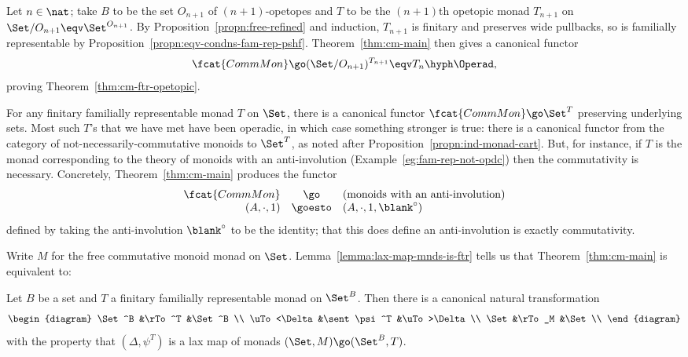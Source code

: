\begin{example}	
Let $n\in\nat$; take $B$ to be the set $O_{n+1}$ of $(n+1)$-opetopes and
$T$ to be the $(n+1)$th opetopic%
%
%
monad $T_{n+1}$ on $\Set/O_{n+1} \eqv
\Set^{O_{n+1}}$.  By Proposition~\ref{propn:free-refined} and induction,
$T_{n+1}$ is finitary and preserves wide pullbacks, so is familially
representable by Proposition~\ref{propn:eqv-condns-fam-rep-pshf}.
Theorem~\ref{thm:cm-main} then gives a canonical functor
\[
\fcat{CommMon} 
\go 
(\Set/O_{n+1})^{T_{n+1}}
\eqv
T_n \hyph\Operad,
\]
proving Theorem~\ref{thm:cm-ftr-opetopic}.
\end{example}

\begin{example}	
For any finitary familially representable monad $T$ on $\Set$, there is a
canonical functor $\fcat{CommMon} \go \Set^T$ preserving underlying sets.
Most such $T$'s that we have met have been operadic,%
%
%
in which case
something stronger is true: there is a canonical functor from the category
of not-necessarily-commutative monoids to $\Set^T$, as noted after
Proposition~\ref{propn:ind-monad-cart}.  But, for instance, if $T$ is the
monad corresponding to the theory of monoids%
%
%
with an
anti-involution (Example~\ref{eg:fam-rep-not-opdc}) then the commutativity is
necessary.  Concretely, Theorem~\ref{thm:cm-main} produces the functor
\[
\begin{array}{rcl}
\fcat{CommMon} 	&\go 	&(\textrm{monoids with an anti-involution}) 	\\
(A,\cdot,1)	&\goesto&(A, \cdot, 1, \blank^\circ)			\\
\end{array}
\]
defined by taking the anti-involution $\blank^\circ$ to be the identity;
that this does define an anti-involution is exactly commutativity.
\end{example}

Write $M$%
% 
% 
for the free commutative monoid monad on $\Set$.
Lemma~\ref{lemma:lax-map-mnds-is-ftr} tells us that
Theorem~\ref{thm:cm-main} is equivalent to:
%
\begin{cor}	
Let $B$ be a set and $T$ a finitary familially representable monad on
$\Set^B$.  Then there is a canonical natural transformation
\[
\begin{diagram}
\Set^B 		&\rTo^T		&\Set^B		\\
\uTo<\Delta	&\sent \psi^T	&\uTo>\Delta	\\
\Set		&\rTo_M		&\Set		\\
\end{diagram}
\]
with the property that $(\Delta, \psi^T)$ is a lax map of monads $(\Set,M)
\go (\Set^B,T)$.  
\done
\end{cor}

